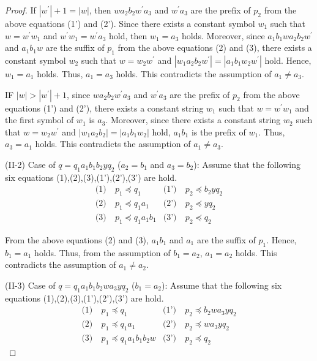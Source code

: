 \begin{proof}
\noindent
If $|w^{\prime}|+1=|w|$, then $wa_{2}b_{2}w^{\prime}a_{3}$ and $w^{\prime}a_{3}$ are the prefix of $p_{2}$ from the above equations (1') and (2').
Since there exists a constant symbol $w_{1}$ such that $w=w^{\prime}w_{1}$ and $w^{\prime}w_{1}=w^{\prime}a_{3}$ hold, then $w_{1}=a_{3}$ holds.
Moreover, since $a_{1}b_{1}wa_{2}b_{2}w^{\prime}$ and $a_{1}b_{1}w$ are the suffix of $p_{1}$ from the above equations (2) and (3), 
there exists a constant symbol $w_{2}$ such that $w=w_{2}w^{\prime}$ and $|w_{1}a_{2}b_{2}w^{\prime}|=|a_{1}b_{1}w_{2}w^{\prime}|$ hold.
Hence, $w_{1}=a_{1}$ holds.
Thus, $a_{1}=a_{3}$ holds.
This contradicts the assumption of $a_{1}\ne a_{3}$.

\noindent
IF $|w| > |w^{\prime}|+1$, since $wa_{2}b_{2}w^{\prime}a_{3}$ and $w^{\prime}a_{3}$ are the prefix of $p_{2}$ from the above equations (1') and (2'),
there exists a constant string $w_{1}$ such that $w=w^{\prime}w_{1}$ and the first symbol of $w_{1}$ is $a_{3}$.
Moreover, since there exists a constant string $w_{2}$ such that $w=w_{2}w^{\prime}$ and $|w_{1}a_{2}b_{2}|=|a_{1}b_{1}w_{2}|$ hold,
$a_{1}b_{1}$ is the prefix of $w_{1}$.
Thus, $a_{3}=a_{1}$ holds.
This contradicts the assumption of $a_{1} \ne a_{3}$.
\smallskip

\noindent
(II-2) Case of $q=q_{1}a_{1}b_{1}b_{2}yq_{2}$ ($a_{2}=b_{1}$ and $a_{3}=b_{2}$):
Assume that the following six equations (1),(2),(3),(1'),(2'),(3') are hold.
\begin{align*}
\textrm{(1)}~& p_{1} \preceq q_{1} & \textrm{(1')}~& p_{2} \preceq b_{2}yq_{2} \\
\textrm{(2)}~& p_{1} \preceq q_{1}a_{1} & \textrm{(2')}~& p_{2} \preceq yq_{2} \\
\textrm{(3)}~& p_{1} \preceq q_{1}a_{1}b_{1} & \textrm{(3')}~& p_{2} \preceq q_{2}
\end{align*}

\noindent
From the above equations (2) and (3), $a_{1}b_{1}$ and $a_{1}$ are the suffix of $p_{1}$.
Hence, $b_{1}=a_{1}$ holds.
Thus, from the assumption of $b_{1}=a_{2}$, $a_{1}=a_{2}$ holds.
This contradicts the assumption of $a_{1} \ne a_{2}$.
\smallskip

\noindent
(II-3) Case of $q=q_{1}a_{1}b_{1}b_{2}wa_{3}yq_{2}$ ($b_{1}=a_{2}$):
Assume that the following six equations (1),(2),(3),(1'),(2'),(3') are hold.
\begin{align*}
\textrm{(1)}~& p_{1} \preceq q_{1} & \textrm{(1')}~& p_{2} \preceq b_{2}wa_{3}yq_{2} \\
\textrm{(2)}~& p_{1} \preceq q_{1}a_{1} & \textrm{(2')}~& p_{2} \preceq wa_{3}yq_{2} \\
\textrm{(3)}~& p_{1} \preceq q_{1}a_{1}b_{1}b_{2}w & \textrm{(3')}~& p_{2} \preceq q_{2}
\end{align*}


\end{proof}
